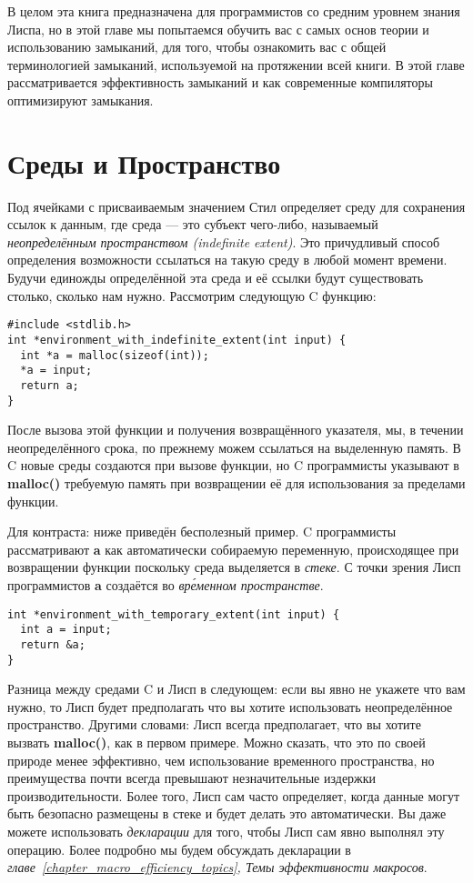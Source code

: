 В целом эта книга предназначена для программистов со средним уровнем знания Лиспа, но в этой главе мы попытаемся обучить вас с самых основ теории и использованию замыканий, для того, чтобы ознакомить вас с общей терминологией замыканий, используемой на протяжении всей книги. В этой главе рассматривается эффективность замыканий и как современные компиляторы оптимизируют замыкания.

\section{Среды и Пространство}\label{section_environments_and_extent}

Под ячейками с присваиваемым значением Стил определяет среду для сохранения ссылок к данным, где среда --- это субъект чего-либо, называемый \emph{неопределённым пространством (indefinite extent)}. Это причудливый способ определения возможности ссылаться на такую среду в любой момент времени. Будучи единожды определённой эта среда и её ссылки будут существовать столько, сколько нам нужно. Рассмотрим следующую C функцию:

\begin{verbatim}
#include <stdlib.h>
int *environment_with_indefinite_extent(int input) {
  int *a = malloc(sizeof(int));
  *a = input;
  return a;
}
\end{verbatim}

После вызова этой функции и получения возвращённого указателя, мы, в течении неопределённого срока, по прежнему можем ссылаться на выделенную память. В C новые среды создаются при вызове функции, но C программисты указывают в \textbf{malloc()} требуемую память при возвращении её для использования за пределами функции.

Для контраста: ниже приведён бесполезный пример. C программисты рассматривают \textbf{a} как автоматически собираемую переменную, происходящее при возвращении функции поскольку среда выделяется в \emph{стеке}. С точки зрения Лисп программистов \textbf{a} создаётся во \emph{вр\'{е}менном пространстве}.

\begin{verbatim}
int *environment_with_temporary_extent(int input) {
  int a = input;
  return &a;
}
\end{verbatim}

Разница между средами C и Лисп в следующем: если вы явно не укажете что вам нужно, то Лисп будет предполагать что вы хотите использовать неопределённое пространство. Другими словами: Лисп всегда предполагает, что вы хотите вызвать \textbf{malloc()}, как в первом примере. Можно сказать, что это по своей природе менее эффективно, чем использование временного пространства, но преимущества почти всегда превышают незначительные издержки производительности. Более того, Лисп сам часто определяет, когда данные могут быть безопасно размещены в стеке и будет делать это автоматически. Вы даже можете использовать \emph{декларации} для того, чтобы Лисп сам явно выполнял эту операцию. Более подробно мы будем обсуждать декларации в \emph{главе~\ref{chapter_macro_efficiency_topics}, Темы эффективности макросов}.

